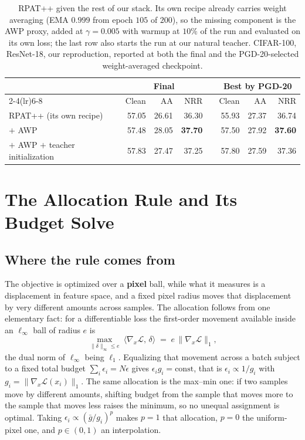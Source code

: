 \begin{table}[!htbp]
  \centering \small \setlength{\tabcolsep}{4.5pt}
  \caption{RPAT++ given the rest of our stack. Its own recipe already carries weight averaging (EMA
  $0.999$ from epoch $105$ of $200$), so the missing component is the AWP proxy, added at
  $\gamma = 0.005$ with warmup at $10\%$ of the run and evaluated on its own loss; the last row also
  starts the run at our natural teacher. CIFAR-100, ResNet-18, our reproduction, reported at both the
  final and the PGD-20-selected weight-averaged checkpoint.}
  \label{tab:rpatstack}
  \begin{tabular}{lrrrcrrr}
    \toprule
    & \multicolumn{3}{c}{Final} & & \multicolumn{3}{c}{Best by PGD-20} \\
    \cmidrule(lr){2-4}\cmidrule(lr){6-8}
    & Clean & AA & NRR & & Clean & AA & NRR \\
    \midrule
    RPAT++ (its own recipe)   & 57.05 & 26.61 & 36.30 & & 55.93 & 27.37 & 36.74 \\
    \quad $+$ AWP             & 57.48 & 28.05 & \textbf{37.70} & & 57.50 & 27.92 & \textbf{37.60} \\
    \quad $+$ AWP $+$ teacher initialization & 57.83 & 27.47 & 37.25 & & 57.80 & 27.59 & 37.36 \\
    \bottomrule
  \end{tabular}
\end{table}

\section{The Allocation Rule and Its Budget Solve}
\label{app:box}

\subsection{Where the rule comes from}

The objective is optimized over a \textbf{pixel} ball, while what it measures is a displacement in
feature space, and a fixed pixel radius moves that displacement by very different amounts across
samples. The allocation follows from one elementary fact: for a differentiable loss the first-order
movement available inside an $\ell_\infty$ ball of radius $e$ is
\begin{equation}
\max_{\lVert\delta\rVert_\infty \le e}\ \langle \nabla_x \mathcal{L},\, \delta\rangle
\;=\; e\,\lVert \nabla_x \mathcal{L}\rVert_1 ,
\label{eqn:dual}
\end{equation}
the dual norm of $\ell_\infty$ being $\ell_1$. Equalizing that movement across a batch subject to a
fixed total budget $\sum_i \epsilon_i = N\epsilon$ gives $\epsilon_i g_i = \mathrm{const}$, that is
$\epsilon_i \propto 1/g_i$ with $g_i = \lVert\nabla_x\mathcal{L}(x_i)\rVert_1$. The same allocation is
the max--min one: if two samples move by different amounts, shifting budget from the sample that moves
more to the sample that moves less raises the minimum, so no unequal assignment is optimal. Taking
$\epsilon_i \propto (\bar g/g_i)^p$ makes $p=1$ that allocation, $p=0$ the uniform-pixel one, and
$p \in (0,1)$ an interpolation.


